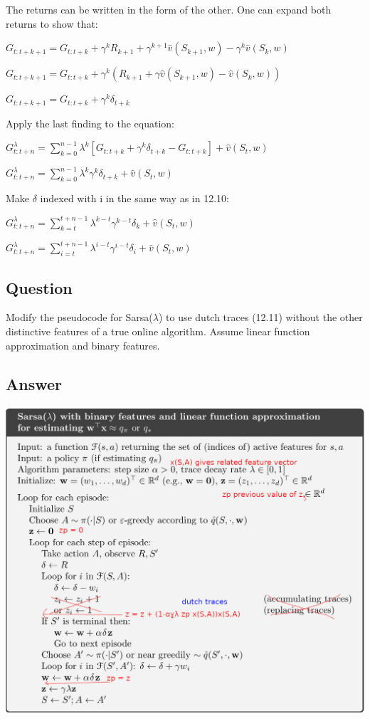 \documentclass[11pt]{article}
\begin{document}
    \hfill \break
    \noindent The returns can be written in the form of the other.
    One can expand both returns to show that:

    \noindent $ G_{t:t+k+1} = G_{t:t+k} + \gamma^{k} R_{k+1} + \gamma^{k+1} \hat{v}(S_{k+1},w) - \gamma^{k} \hat{v}(S_{k},w)   $

    \noindent $ G_{t:t+k+1} = G_{t:t+k} + \gamma^{k} ( R_{k+1} + \gamma \hat{v}(S_{k+1},w) - \hat{v}(S_{k},w)  ) $

    \noindent $ G_{t:t+k+1} = G_{t:t+k} + \gamma^{k} \delta_{t+k} $

    \hfill \break
    \noindent Apply the last finding to the equation:

    \noindent $ G_{t:t+n}^{\lambda} = \sum_{k=0}^{n-1} \lambda^{k} [G_{t:t+k} + \gamma^{k} \delta_{t+k} - G_{t:t+k}] + \hat{v}(S_t, w) $

    \noindent $ G_{t:t+n}^{\lambda} = \sum_{k=0}^{n-1} \lambda^{k} \gamma^{k} \delta_{t+k} + \hat{v}(S_t, w) $

    \hfill \break
    \noindent Make $\delta$ indexed with i in the same way as in 12.10:

    \noindent $ G_{t:t+n}^{\lambda} = \sum_{k=t}^{t+n-1} \lambda^{k-t} \gamma^{k-t} \delta_{k} + \hat{v}(S_t, w) $

    \noindent $ G_{t:t+n}^{\lambda} = \sum_{i=t}^{t+n-1} \lambda^{i-t} \gamma^{i-t} \delta_{i} + \hat{v}(S_t, w) $


    \subsection{Question}

    Modify the pseudocode for Sarsa($\lambda$) to use dutch traces (12.11) without the other distinctive features of a true online algorithm.
    Assume linear function approximation and binary features.

    \subsection*{Answer}

    \includegraphics[scale=0.9]{exercise_12_6}
\end{document}
